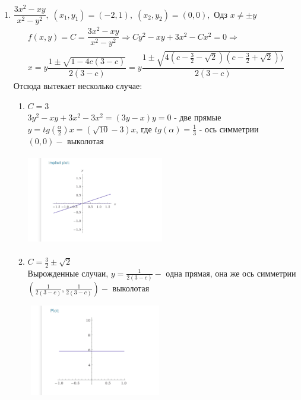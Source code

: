 \documentclass[a4paper,11pt]{article}
\begin{document}
\begin{enumerate}
	\item $ \dfrac{3x^2 - xy}{x^2 - y^2}, \; (x_1, y_1) = (-2, 1), \; (x_2, y_2) = (0, 0), \text{ Одз } x \neq \pm y $ \\[6pt]
	\begin{gather*}
	f(x, y) = C = \dfrac{3x^2 - xy}{x^2 - y^2} \Rightarrow Cy^2 - xy + 3x^2 - Cx^2 = 0 \Rightarrow \\[2pt]
	x = y\dfrac{1 \pm \sqrt{1 - 4c(3 - c)}}{2(3 - c)} = 
	y\dfrac{1 \pm \sqrt{4(c - \frac32 - \sqrt{2})(c - \frac32 + \sqrt{2}))}}{2(3 - c)}
	\end{gather*}
	Отсюда вытекает несколько случае:
	\begin{enumerate}
		\item $ C = 3 $ \\[2pt]
		$ 3y^2 - xy + 3x^2 - 3x^2 = (3y - x)y = 0 $ - две прямые 
		$ y = tg(\frac{\alpha}2)x  =  (\sqrt{10} - 3)x $, где $ tg(\alpha) = \frac13 $ - ось симметрии \\
		$ (0, 0) - $ выколотая
		\begin{center}
			\includegraphics[width = 60mm, height=40mm]{images/3.png}
		\end{center}
		
		
		\item $ C = \frac32 \pm \sqrt{2} $ \\ 
		Вырожденные случаи, $ y = \frac{1}{2(3 - c)} - $ одна прямая, она же ось симметрии \\
		$ (\frac{1}{2(3 - c)}, \frac{1}{2(3 - c)}) - $ выколотая
		\begin{center}
			\includegraphics[width = 60mm, height=40mm]{images/4.png}
		\end{center}
		

\end{enumerate}
\end{enumerate}
\end{document}
